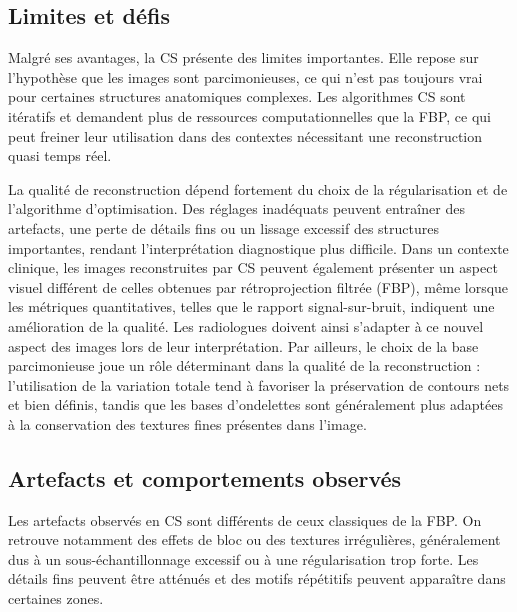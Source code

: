 \subsection{Limites et défis}

Malgré ses avantages, la CS présente des limites importantes. Elle repose sur l'hypothèse que les images sont parcimonieuses, ce qui n'est pas toujours vrai pour certaines structures anatomiques complexes. Les algorithmes CS sont itératifs et demandent plus de ressources computationnelles que la FBP, ce qui peut freiner leur utilisation dans des contextes nécessitant une reconstruction quasi temps réel.


La qualité de reconstruction dépend fortement du choix de la régularisation et de l'algorithme d'optimisation. Des réglages inadéquats peuvent entraîner des artefacts, une perte de détails fins ou un lissage excessif des structures importantes, rendant l'interprétation diagnostique plus difficile. Dans un contexte clinique, les images reconstruites par CS peuvent également présenter un aspect visuel différent de celles obtenues par rétroprojection filtrée (FBP), même lorsque les métriques quantitatives, telles que le rapport signal-sur-bruit, indiquent une amélioration de la qualité. Les radiologues doivent ainsi s'adapter à ce nouvel  aspect  des images lors de leur interprétation. Par ailleurs, le choix de la base parcimonieuse joue un rôle déterminant dans la qualité de la reconstruction : l'utilisation de la variation totale tend à favoriser la préservation de contours nets et bien définis, tandis que les bases d'ondelettes sont généralement plus adaptées à la conservation des textures fines présentes dans l'image.

\subsection{Artefacts et comportements observés}

Les artefacts observés en CS sont différents de ceux classiques de la FBP. On retrouve notamment des effets de bloc ou des textures irrégulières, généralement dus à un sous-échantillonnage excessif ou à une régularisation trop forte. Les détails fins peuvent être atténués et des motifs répétitifs peuvent apparaître dans certaines zones.  

